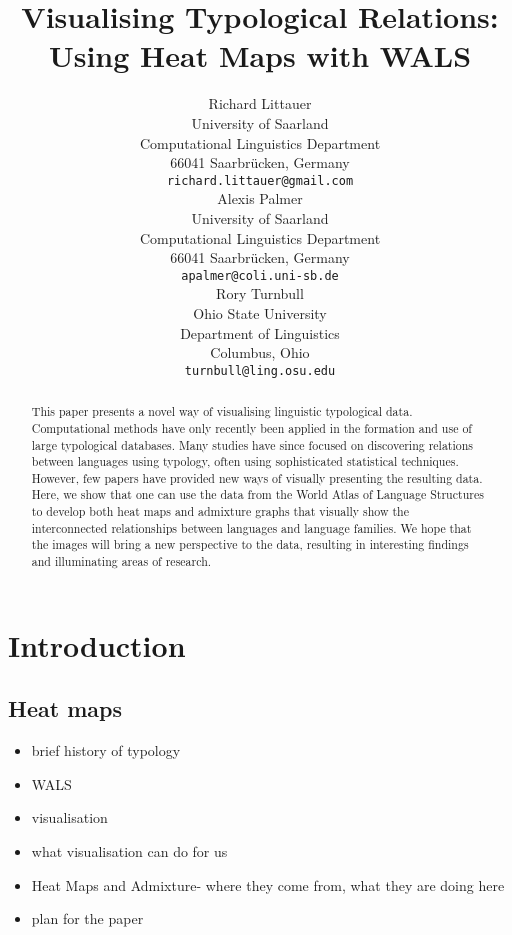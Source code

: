 \documentclass[11pt]{article}
\title{Visualising Typological Relations: Using Heat Maps with WALS}
\author{Richard Littauer \\
University of Saarland\\
Computational Linguistics Department\\
66041 Saarbr\"ucken, Germany\\
  {\tt richard.littauer@gmail.com} \\\And
Alexis Palmer\\
University of Saarland\\
Computational Linguistics Department\\
66041 Saarbr\"ucken, Germany\\
  {\tt apalmer@coli.uni-sb.de} \\\AND
Rory Turnbull \\
Ohio State University\\
Department of Linguistics\\
Columbus, Ohio\\
  {\tt turnbull@ling.osu.edu} \\}
\date{}
\begin{document}
\maketitle
\begin{abstract}
This paper presents a novel way of visualising linguistic typological data. Computational methods have only recently been applied in the formation and use of large typological databases. Many studies have since focused on discovering relations between languages using typology, often using sophisticated statistical techniques. However, few papers have provided new ways of visually presenting the resulting data. Here, we show that one can use the data from the World Atlas of Language Structures\cite{wals-2011} to develop both heat maps and admixture graphs that visually show the interconnected relationships between languages and language families. We hope that the images will bring a new perspective to the data, resulting in interesting findings and illuminating areas of research.
\end{abstract}


\section{Introduction}
\subsection{Heat maps}
\begin{itemize}
\item brief history of typology
\item WALS
\item visualisation
\item what visualisation can do for us
\item Heat Maps and Admixture-  where they come from, what they are doing here
\item plan for the paper
\end{itemize}


%
%
%
%
%
%
%
\end{document}
